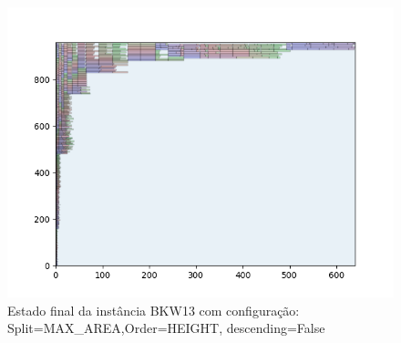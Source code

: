 \begin{figure}[H]
    \centering
    \caption[]{Estado final da instância BKW13 com configuração: Split=MAX_AREA,Order=HEIGHT, descending=False}
    \label{fig:bkw13-max_area-height-false}
    \includegraphics[scale=0.5]{output/figures/bkw/bkw13/max_area/height/false/0000}
\end{figure}
